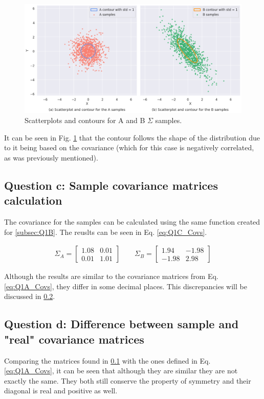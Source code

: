 \documentclass{article}
\begin{document}
\begin{figure}[tb]
    \centering
    \includegraphics[width=\linewidth]{Img/Q1B.png}
    \caption{Scatterplots and contours for A and B $\Sigma$ samples.}
    \label{fig:Q1B_plot}
\end{figure}

It can be seen in Fig. \ref{fig:Q1B_plot} that the contour follows the shape of the distribution due to it being based on the covariance (which for this case is negatively correlated, as was previously mentioned).

\subsection{Question c: Sample covariance matrices calculation}
\label{subsec:Q1C}
The covariance for the samples can be calculated using the same function created for \ref{subsec:Q1B}. The reuslts can be seen in Eq. \ref{eq:Q1C_Covs}.

\begin{gather}\label{eq:Q1C_Covs}
\Sigma_A = \begin{bmatrix}
1.08 & 0.01\\
0.01 & 1.01
\end{bmatrix}
\qquad
\Sigma_B = \begin{bmatrix}
1.94 & -1.98\\
-1.98 & 2.98
\end{bmatrix}
\end{gather}

Although the results are similar to the covariance matrices from Eq. \ref{eq:Q1A_Covs}, they differ in some decimal places. This discrepancies will be discussed in \ref{subsec:Q1D}.

\subsection{Question d: Difference between sample and "real" covariance matrices}
\label{subsec:Q1D}
Comparing the matrices found in \ref{subsec:Q1C} with the ones defined in Eq. \ref{eq:Q1A_Covs}, it can be seen that although they are similar they are not exactly the same. They both still conserve the property of symmetry and their diagonal is real and positive as well.
\end{document}
